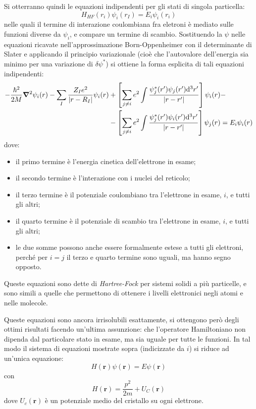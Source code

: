 Si otterranno quindi le equazioni indipendenti per gli stati di singola particella:
\[ H_{HF}(r_i) \psi_i(r_I) = E_i \psi_i(r_i) \]
nelle quali il termine di interazione coulombiana fra eletroni è mediato sulle funzioni diverse da $ \psi_i $, e compare un termine di scambio.
Sostituendo la $ \psi $ nelle equazioni ricavate nell'approssimazione Born-Oppenheimer con il determinante di Slater e applicando il principio variazionale (cioè che l'autovalore dell'energia sia minimo per una variazione di $ \delta \psi^\ast $) si ottiene la forma esplicita di tali equazioni indipendenti:
\begin{align*}
-\frac{\hbar^2}{2M}\grad^2{\psi_i(r)} - \sum_I \frac{Z_I e^2}{\abs{r- R_I}} \psi_i(r) &+ \left[\sum_{j\neq i} e^2 \int \frac{\psi_j^\ast (r')\psi_j (r') \dd^3 r'}{\abs{r-r'}} \right] \psi_i(r) -\\
&- \left[\sum_{j\neq i} e^2 \int \frac{\psi_j^\ast (r')\psi_i (r') \dd^3 r'}{\abs{r-r'}} \right] \psi_j(r) = E_i \psi_i(r)
\end{align*}
dove:
\begin{itemize}
	\item il primo termine è l'energia cinetica dell'elettrone in esame;
	\item il secondo termine è l'interazione con i nuclei del reticolo;
	\item il terzo termine è il potenziale coulombiano tra l'elettrone in esame, $ i $, e tutti gli altri;
	\item il quarto termine è il potenziale di scambio tra l'elettrone in esame, $ i $, e tutti gli altri;
	\item le due somme possono anche essere formalmente estese a tutti gli elettroni, perché per $ i = j $ il terzo e quarto termine sono uguali, ma hanno segno opposto.
\end{itemize}

Queste equazioni sono dette di \textit{Hartree-Fock} per sistemi solidi a più particelle, e sono simili a quelle che permettono di ottenere i livelli elettronici negli atomi e nelle molecole.

Queste equazioni sono ancora irrisolubili esattamente, si ottengono però degli ottimi risultati facendo un'ultima assunzione: che l'operatore Hamiltoniano non dipenda dal particolare stato in esame, ma sia uguale per tutte le funzioni.
In tal modo il sistema di equazioni mostrate sopra (indicizzate da $ i $) si riduce ad un'unica equazione:
\[ H(\textbf{r}) \psi(\textbf{r}) = E \psi(\textbf{r}) \]
con
\[ H(\textbf{r}) = \frac{p^2}{2m} + U_C(\textbf{r}) \]
dove $ U_c(\textbf{r}) $ è un potenziale medio del cristallo su ogni elettrone.

